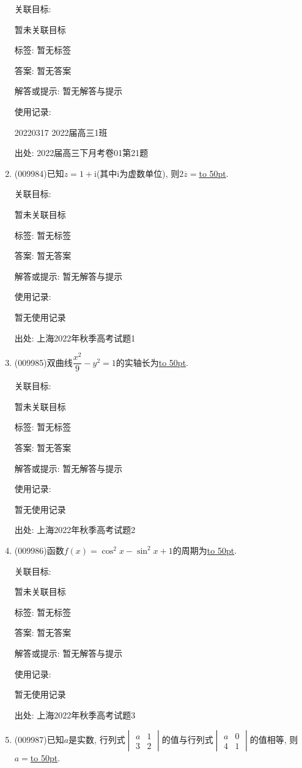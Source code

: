 \documentclass[10pt,a4paper]{article}
\newcommand{\blank}[1]{\underline{\hbox to #1pt{}}}
\begin{document}
\begin{enumerate}[1.]
关联目标:

暂未关联目标



标签: 暂无标签

答案: 暂无答案

解答或提示: 暂无解答与提示

使用记录:

20220317	2022届高三1班			


出处: 2022届高三下月考卷01第21题
\item { (009984)}已知$z=1+\mathrm{i}$(其中$\mathrm{i}$为虚数单位), 则$2\overline{z}=$\blank{50}.


关联目标:

暂未关联目标



标签: 暂无标签

答案: 暂无答案

解答或提示: 暂无解答与提示

使用记录:

暂无使用记录


出处: 上海2022年秋季高考试题1
\item { (009985)}双曲线$\dfrac{x^2}{9}-y^2=1$的实轴长为\blank{50}.


关联目标:

暂未关联目标



标签: 暂无标签

答案: 暂无答案

解答或提示: 暂无解答与提示

使用记录:

暂无使用记录


出处: 上海2022年秋季高考试题2
\item { (009986)}函数$f(x)=\cos^2 x-\sin ^2 x+1$的周期为\blank{50}.


关联目标:

暂未关联目标



标签: 暂无标签

答案: 暂无答案

解答或提示: 暂无解答与提示

使用记录:

暂无使用记录


出处: 上海2022年秋季高考试题3
\item { (009987)}已知$a$是实数, 行列式$\begin{vmatrix}    a & 1 \\ 3 & 2\end{vmatrix}$的值与行列式$\begin{vmatrix}    a & 0 \\ 4 & 1\end{vmatrix}$的值相等, 则$a=$\blank{50}.



\end{enumerate}
\end{document}
